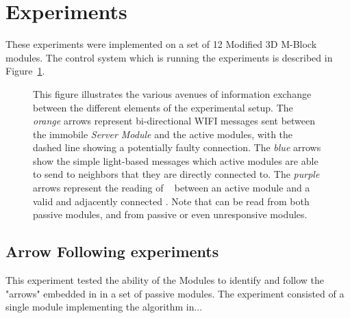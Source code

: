 \section{Experiments}
\label{sec:Experiments}

These experiments were implemented on a set of 12 Modified 3D M-Block modules. The control system which is running the experiments is described in Figure~\ref{fig:electroncsChart}.

\begin{figure}[ht]

	
	
\caption{This figure illustrates the various avenues of information exchange between the different elements of the experimental setup. The \emph{orange} arrows represent bi-directional WIFI messages sent between the immobile \emph{Server Module} and the active modules, with the dashed line showing a potentially faulty connection. The \emph{blue} arrows show the simple light-based messages which active modules are able to send to neighbors that they are directly connected to. The \emph{purple} arrows represent the reading of \tagNamePlural~ between an active module and a valid and adjacently connected \tagName. Note that \tagNamePlural can be read from both passive modules, and from passive or even unresponsive modules.}
	
	\label{fig:electroncsChart}
\end{figure}



\subsection{Arrow Following experiments}
\label{sec:mblocksExperimentsArrow}
This experiment tested the ability of the Modules to identify and follow the "arrows" embedded in in a set of passive modules. The experiment consisted of a single module 
implementing the algorithm in... 

